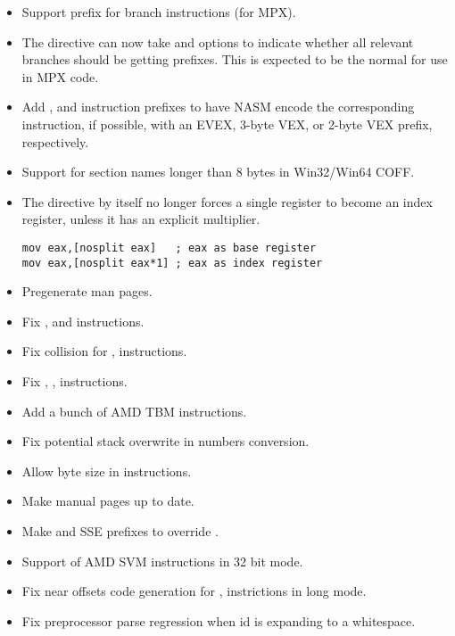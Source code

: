 \begin{itemize}
    \item{Support  prefix for branch instructions (for MPX).}

    \item{The  directive can now take  and 
        options to indicate whether all relevant branches should be getting
         prefixes. This is expected to be the normal for use in MPX
        code.}

    \item{Add ,  and  instruction prefixes to
        have NASM encode the corresponding instruction, if possible, with an EVEX,
        3-byte VEX, or 2-byte VEX prefix, respectively.}

    \item{Support for section names longer than 8 bytes in Win32/Win64 COFF.}

    \item{The  directive by itself no longer forces a single
        register to become an index register, unless it has an explicit
        multiplier.
\begin{lstlisting}
mov eax,[nosplit eax]   ; eax as base register
mov eax,[nosplit eax*1] ; eax as index register
\end{lstlisting}}
\end{itemize}


\begin{itemize}
    \item{Pregenerate man pages.}
\end{itemize}


\begin{itemize}
    \item{Fix ,  and  instructions.}
    \item{Fix collision for ,  instructions.}
    \item{Fix , ,  instructions.}
    \item{Add a bunch of AMD TBM instructions.}
    \item{Fix potential stack overwrite in numbers conversion.}
    \item{Allow byte size in  instructions.}
    \item{Make manual pages up to date.}
    \item{Make  and  SSE prefixes to override .}
    \item{Support of AMD SVM instructions in 32 bit mode.}
    \item{Fix near offsets code generation for ,  instrictions in long mode.}
    \item{Fix preprocessor parse regression when id is expanding to a whitespace.}
\end{itemize}

